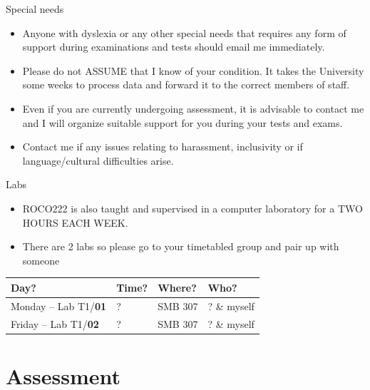 \documentclass[compress]{beamer}
\begin{document}
\begin{frame}{Special needs}

    \begin{itemize}

    \item Anyone with dyslexia or any other special needs that requires any form
        of support during examinations and tests should email me immediately.

    \item Please do not ASSUME that I know of your condition. It takes the
        University some weeks to process data and forward it to the correct
            members of staff.

    \item Even if you are currently undergoing assessment, it is advisable to
        contact me and I will organize suitable support for you during your
            tests and exams.

    \item Contact me if any issues relating to harassment, inclusivity or if
        language/cultural difficulties arise.

    \end{itemize}
\end{frame}

\begin{frame}{Labs}
    \begin{itemize}
        \item ROCO222 is also taught and supervised in a computer laboratory for
            a TWO HOURS EACH WEEK.
        \item There are 2 labs so please go to your timetabled group and pair up
            with someone
    \end{itemize}

    \centering
          \begin{tabular}{@{}llll@{}}
                \toprule
                Day?                & Time? & Where?   & Who? \\ \midrule
                Monday -- Lab T1/\textbf{01} & ?     & SMB 307  & ? \& myself            \\
                Friday -- Lab T1/\textbf{02} & ?     & SMB 307  & ? \& myself          \\ \bottomrule
            \end{tabular}


\end{frame}

\section{Assessment}
\end{document}
